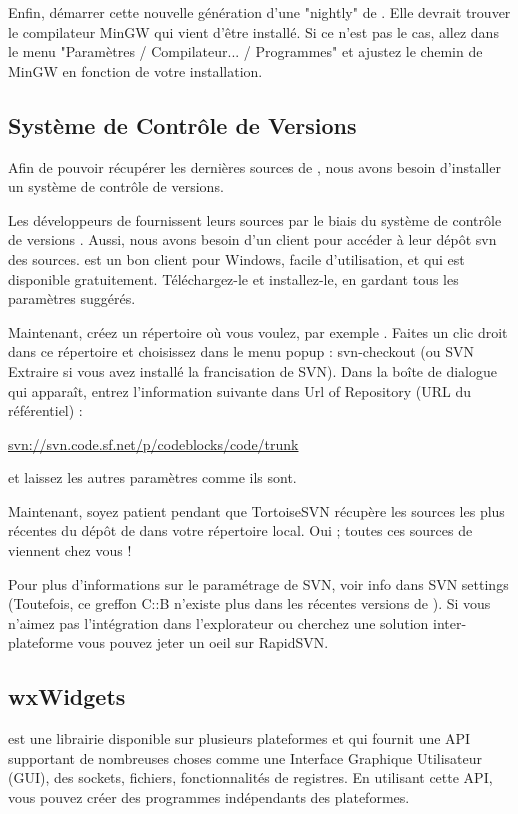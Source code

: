 Enfin, démarrer cette nouvelle génération d'une "nightly" de \codeblocks. Elle devrait trouver le compilateur MinGW qui vient d'être installé. Si ce n'est pas le cas, allez dans le menu "Paramètres / Compilateur... / Programmes" et ajustez le chemin de MinGW en fonction de votre installation.

\subsection{Système de Contrôle de Versions}

Afin de pouvoir récupérer les dernières sources de \codeblocks, nous avons besoin d'installer un système de contrôle de versions.

Les développeurs de \codeblocks fournissent leurs sources par le biais du système de contrôle de versions \cite{url:subversion}. Aussi, nous avons besoin d'un client pour accéder à leur dépôt svn des sources. \cite{url:tortoisesvn} est un bon client pour Windows, facile d'utilisation, et qui est disponible gratuitement. Téléchargez-le et installez-le, en gardant tous les paramètres suggérés.

Maintenant, créez un répertoire où vous voulez, par exemple . Faites un clic droit dans ce répertoire et choisissez dans le menu popup : svn-checkout (ou SVN Extraire si vous avez installé la francisation de SVN). Dans la boîte de dialogue qui apparaît, entrez l'information suivante dans Url of Repository (URL du référentiel) :

\url{svn://svn.code.sf.net/p/codeblocks/code/trunk}

et laissez les autres paramètres comme ils sont.

Maintenant, soyez patient pendant que TortoiseSVN récupère les sources les plus récentes du dépôt de \codeblocks dans votre répertoire local. Oui ; toutes ces sources de \codeblocks viennent chez vous !

Pour plus d'informations sur le paramétrage de SVN, voir info dans SVN settings (Toutefois, ce greffon C::B n'existe plus dans les récentes versions de \codeblocks). Si vous n'aimez pas l'intégration dans l'explorateur ou cherchez une solution inter-plateforme vous pouvez jeter un oeil sur RapidSVN.

\subsection{wxWidgets}

\cite{url:wx} est une librairie disponible sur plusieurs plateformes et qui fournit une API supportant de nombreuses choses comme une Interface Graphique Utilisateur (GUI), des sockets, fichiers, fonctionnalités de registres. En utilisant cette API, vous pouvez créer des programmes indépendants des plateformes.


